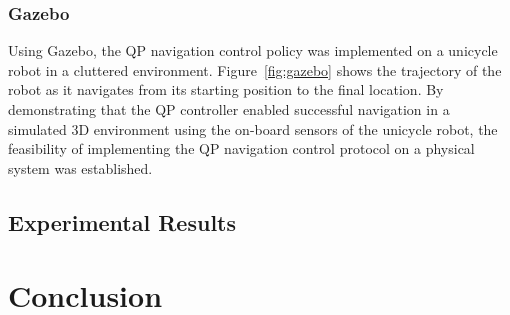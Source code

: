 \documentclass[journal]{IEEEtran}
\begin{document}
\subsubsection{Gazebo}
Using Gazebo, the QP navigation control policy was implemented on a unicycle robot in a cluttered environment. Figure~\ref{fig:gazebo} shows the trajectory of the robot as it navigates from its starting position to the final location. By demonstrating that the QP controller enabled successful navigation in a simulated 3D environment using the on-board sensors of the unicycle robot, the feasibility of implementing the QP navigation control protocol on a physical system was established. 


\subsection{Experimental Results}

\section{Conclusion}



\end{document}
